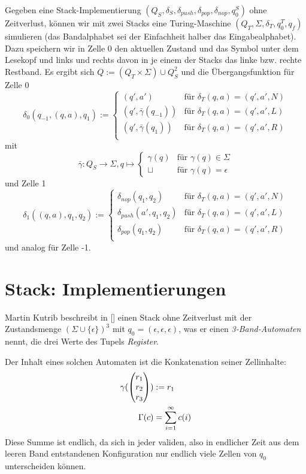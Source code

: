 \documentclass{article}
\begin{document}
\begin{beispiel}
    Gegeben eine Stack-Implementierung $(Q_S, \delta_S, \delta_{push}, \delta_{pop}, \delta_{nop}, q^S_0)$ ohne Zeitverlust, können wir mit zwei Stacks eine Turing-Maschine $(Q_T, \Sigma, \delta_T, q^T_0, q_f)$ simulieren (das Bandalphabet sei der Einfachheit halber das Eingabealphabet). Dazu speichern wir in Zelle 0  den aktuellen Zustand und das Symbol unter dem Lesekopf und links und rechts davon in je einem der Stacks das linke bzw. rechte Restband. Es ergibt sich $Q := (Q_T \times \Sigma) \cup Q^2_S$ und die Übergangsfunktion für Zelle 0
    \[ \delta_0(q_{-1}, (q, a), q_1) :=
    \begin{cases}
        (q', a') &\text{für } \delta_T(q, a) = (q', a', N) \\
        (q', \bar\gamma(q_{-1})) &\text{für } \delta_T(q, a) = (q', a', L) \\
        (q', \bar\gamma(q_1)) &\text{für } \delta_T(q, a) = (q', a', R) \\
    \end{cases} \]
mit
\[ \bar\gamma : Q_S \rightarrow \Sigma, q \mapsto \begin{cases}
        \gamma(q) &\text{für } \gamma(q) \in \Sigma \\
        \sqcup &\text{für } \gamma(q) = \epsilon
    \end{cases} \]
und Zelle 1
    \[ \delta_1((q, a), q_1, q_2) :=
    \begin{cases}
        \delta_{nop}(q_1, q_2) &\text{für } \delta_T(q, a) = (q', a', N) \\
        \delta_{push}(a', q_1, q_2) &\text{für } \delta_T(q, a) = (q', a', L) \\
        \delta_{pop}(q_1, q_2) &\text{für } \delta_T(q, a) = (q', a', R) \\
    \end{cases} \]
und analog für Zelle -1.
\end{beispiel}

\section{Stack: Implementierungen}

Martin Kutrib beschreibt in [] einen Stack ohne Zeitverlust mit der Zustandsmenge $(\Sigma \cup \{\epsilon\})^3$ mit $q_0 = (\epsilon,\epsilon,\epsilon)$, was er einen \emph{3-Band-Automaten} nennt, die drei Werte des Tupels \emph{Register}.

Der Inhalt eines solchen Automaten ist die Konkatenation seiner Zellinhalte:
\begin{align*}
    \gamma(\begin{pmatrix}r_1\\r_2\\r_3\end{pmatrix}) &:= r_1 \\
\Gamma(c) &= \sum^\infty_{i=1} c(i)
\end{align*}
Diese Summe ist endlich, da sich in jeder validen, also in endlicher Zeit aus dem leeren Band entstandenen Konfiguration nur endlich viele Zellen von $q_0$ unterscheiden können.
\end{document}
